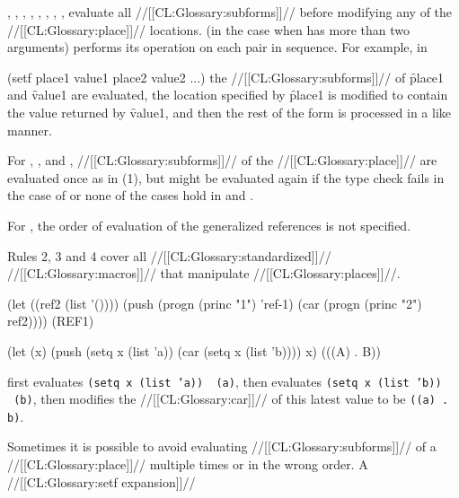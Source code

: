 , , ,  , , , ,  ,  evaluate all //[[CL:Glossary:subforms]]// before modifying any of the //[[CL:Glossary:place]]// locations.  (in the case when  has more than two arguments)  performs its operation on each pair in sequence. For example, in 

\code
 (setf place1 value1 place2 value2 ...) \endcode the //[[CL:Glossary:subforms]]// of \f{place1} and \f{value1} are evaluated, the location specified by  \f{place1} is modified to contain the value returned by  \f{value1}, and then the rest of the  form is processed in a like manner.

 For , , and , //[[CL:Glossary:subforms]]// of the //[[CL:Glossary:place]]// are evaluated once as in (1), but might be evaluated again if the type check fails in the case of   or none of the cases hold in  and .

 For , the order of evaluation of the generalized  references is not specified.

\endlist Rules 2, 3 and 4 cover all //[[CL:Glossary:standardized]]// //[[CL:Glossary:macros]]// that manipulate //[[CL:Glossary:places]]//.


\code
 (let ((ref2 (list '())))
   (push (progn (princ "1") 'ref-1)
         (car (progn (princ "2") ref2))))   \EV (REF1)

 (let (x)
    (push (setq x (list 'a))
          (car (setq x (list 'b))))
     x) \EV (((A) . B)) \endcode

 first evaluates {\tt (setq x (list 'a)) \EV\ (a)},
 then evaluates {\tt (setq x (list 'b)) \EV\ (b)},
 then modifies the //[[CL:Glossary:car]]// of this latest value to be {\tt ((a) . b)}.

\endsubsubsubsection%

\endsubsubsection%

 

Sometimes it is possible to avoid evaluating //[[CL:Glossary:subforms]]// of a  //[[CL:Glossary:place]]// multiple times or in the wrong order.  A  //[[CL:Glossary:setf expansion]]//

